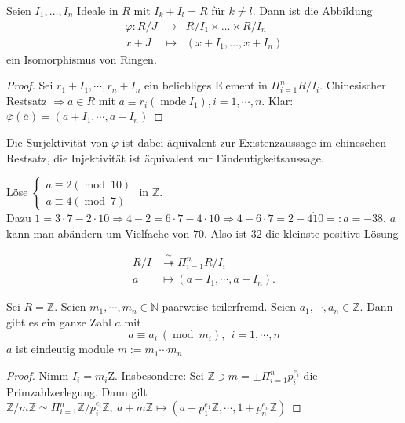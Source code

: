 \begin{theorem}
    Seien $I_{1}, \ldots, I_{n}$ Ideale in $R$ mit $I_{k}+I_{l}=R$ für $k \neq l$. Dann ist die Abbildung
    $$
        \begin{aligned}
            \varphi: R / J & \longrightarrow & R / I_{1} \times \ldots \times R / I_{n} \\
            x+J            & \mapsto         & \left(x+I_{1}, \ldots, x+I_{n}\right)
        \end{aligned}
    $$
    ein Isomorphismus von Ringen.
\end{theorem}
\begin{proof}
    Sei \(r_1+I_1,\cdots,r_n+I_n\) ein beliebliges Element in \(\Pi_{i=1}^nR/I_i\). Chinesischer Restsatz \(\Rightarrow a\in R\) mit \(a\equiv r_i(\operatorname{ mode }I_1), i=1,\cdots,n\). Klar: \(\overline{\varphi}(\overline{a}) = (a+I_1,\cdots,a+I_n)\)
\end{proof}
Die Surjektivität von $\varphi$ ist dabei äquivalent zur Existenzaussage im chineschen Restsatz, die Injektivität ist äquivalent zur Eindeutigkeitsaussage.
\begin{example}
    L\"ose \(\left\{ \begin{matrix*}
        a \equiv 2(\operatorname{mod}\  10)\\
        a \equiv 4(\operatorname{mod}\  7) 
    \end{matrix*}\right.\) in \(\mathbb{Z}\).\\
    Dazu \(
        1=3\cdot 7-2\cdot 10  \Rightarrow 4-2= 6\cdot7-4\cdot 10     \Rightarrow 4-6\cdot 7=2-4\dot 10 = : a=-38
    \). \(a\) kann man ab\"andern um Vielfache von \(70\). Also ist \(32\) die kleinste positive L\"osung
\end{example}
\begin{lemma}
    \begin{align*}
        R/I & \stackrel{\simeq}{\twoheadrightarrow}\Pi_{i=1}^nR/I_i\\
        a&\mapsto (a+I_1,\cdots,a+I_n).
    \end{align*}
\end{lemma}
\begin{lemma}
    Sei \(R=\mathbb{Z}\). Seien \(m_1,\cdots,m_n\in\mathbb{N}\) paarweise teilerfremd. Seien \(a_1,\cdots,a_n\in\mathbb{Z}\). Dann gibt es ein ganze Zahl \(a\) mit \[a\equiv a_i\ (\operatorname{mod}\ m_i),\ \ i=1,\cdots,n\] \(a\) ist eindeutig module \(m:=m_1\cdots m_n\)
\end{lemma}
\begin{proof}
    Nimm \(I_i=m_i\mathrm{Z}\). Insbesondere: Sei \(\mathbb{Z}\ni m=\pm\Pi_{i=1}^np_i^{e_i}\) die Primzahlzerlegung. Dann gilt \(\mathbb{Z}/m\mathbb{Z}\simeq \Pi_{i=1}^n\mathbb{Z}/p_i^{e_i}\mathbb{Z},\ a+m\mathbb{Z}\mapsto (a+p_1^{e_1}\mathbb{Z},\cdots,1+p_n^{e_n}\mathbb{Z})\)
\end{proof}

